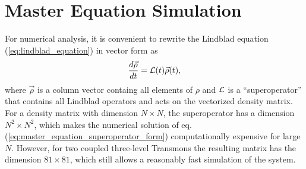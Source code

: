 \section{Master Equation Simulation}

For numerical analysis, it is convenient to rewrite the Lindblad equation (\ref{eq:lindblad_equation}) in vector form as
%
\begin{equation}
\frac{d\vec{\rho}}{dt} = {\cal L}(t)\vec{\rho}(t), \label{eq:master_equation_superoperator_form}
\end{equation}
%
where $\vec{\rho}$ is a column vector containg all elements of $\rho$ and $\cal L$ is a ``superoperator'' that contains all Lindblad operators and acts on the vectorized density matrix. For a density matrix with dimension $N\times N$, the superoperator has a dimension $N^2 \times N^2$, which makes the numerical solution of eq. (\ref{eq:master_equation_superoperator_form}) computationally expensive for large $N$. However, for two coupled three-level Transmons the resulting matrix has the dimension $81\times 81$, which still allows a reasonably fast simulation of the system.







%
